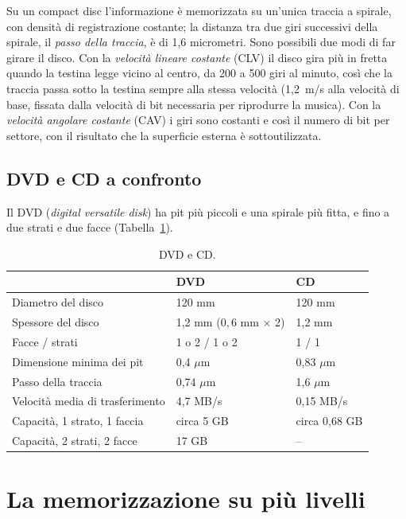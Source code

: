 Su un compact disc l'informazione è memorizzata su un'unica traccia a spirale,
con densità di registrazione costante; la distanza tra due giri successivi
della spirale, il \emph{passo della traccia}, è di 1,6 micrometri. Sono
possibili due modi di far girare il disco. Con la \emph{velocità lineare
costante} (CLV) il disco gira più in fretta quando la testina legge vicino al
centro, da 200 a 500 giri al minuto, così che la traccia passa sotto la testina
sempre alla stessa velocità (1,2~m/s alla velocità di base, fissata dalla
velocità di bit necessaria per riprodurre la musica). Con la \emph{velocità
angolare costante} (CAV) i giri sono costanti e così il numero di bit per
settore, con il risultato che la superficie esterna è sottoutilizzata.

\subsection{DVD e CD a confronto}

Il DVD (\emph{digital versatile disk}) ha pit più piccoli e una spirale più
fitta, e fino a due strati e due facce (Tabella~\ref{tab:st:dvd}).

\begin{table}[htb]
\centering\small
\caption{DVD e CD.}\label{tab:st:dvd}
\begin{tabular}{@{}lll@{}}
\toprule
 & \textbf{DVD} & \textbf{CD}\\
\midrule
Diametro del disco & 120 mm & 120 mm\\
Spessore del disco & 1,2 mm ($0,6$ mm $\times$ 2) & 1,2 mm\\
Facce / strati & 1 o 2 / 1 o 2 & 1 / 1\\
Dimensione minima dei pit & 0,4 $\mu$m & 0,83 $\mu$m\\
Passo della traccia & 0,74 $\mu$m & 1,6 $\mu$m\\
Velocità media di trasferimento & 4,7 MB/s & 0,15 MB/s\\
Capacità, 1 strato, 1 faccia & circa 5 GB & circa 0,68 GB\\
Capacità, 2 strati, 2 facce & 17 GB & --\\
\bottomrule
\end{tabular}
\end{table}

\section{La memorizzazione su più livelli}

